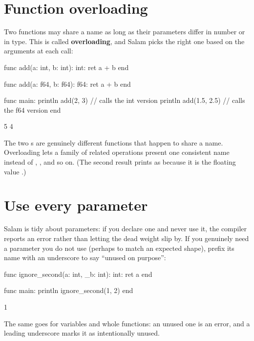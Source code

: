 \section{Function overloading}

Two functions may share a name as long as their parameters differ in number or
in type. This is called \textbf{overloading}, and Salam picks the right one based
on the arguments at each call:

\begin{salamen}
func add(a: int, b: int): int:
    ret a + b
end

func add(a: f64, b: f64): f64:
    ret a + b
end

func main:
    println add(2, 3)        // calls the int version
    println add(1.5, 2.5)    // calls the f64 version
end
\end{salamen}

\begin{progout}
5
4
\end{progout}

The two s are genuinely different functions that happen to share a name.
Overloading lets a family of related operations present one consistent name
instead of , , and so on. (The second result prints as
 because it is the floating value .)

\section{Use every parameter}

Salam is tidy about parameters: if you declare one and never use it, the compiler
reports an error rather than letting the dead weight slip by. If you genuinely
need a parameter you do not use (perhaps to match an expected shape), prefix
its name with an underscore to say ``unused on purpose'':

\begin{salamen}
func ignore_second(a: int, _b: int): int:
    ret a
end

func main:
    println ignore_second(1, 2)
end
\end{salamen}

\begin{progout}
1
\end{progout}

The same goes for variables and whole functions: an unused one is an error, and
a leading underscore marks it as intentionally unused.

